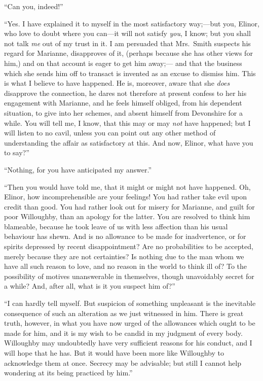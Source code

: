 ``Can you, indeed!''

``Yes. I have explained it to myself in the most
satisfactory way;---but you, Elinor, who love to doubt
where you can---it will not satisfy \emph{you}, I know; but you
shall not talk \emph{me} out of my trust in it.  I am persuaded
that Mrs.\ Smith suspects his regard for Marianne,
disapproves of it, (perhaps because she has other views
for him,) and on that account is eager to get him away;---%
and that the business which she sends him off to transact
is invented as an excuse to dismiss him.  This is what I
believe to have happened.  He is, moreover, aware that she
\emph{does} disapprove the connection, he dares not therefore
at present confess to her his engagement with Marianne,
and he feels himself obliged, from his dependent situation,
to give into her schemes, and absent himself from
Devonshire for a while.  You will tell me, I know,
that this may or may \emph{not} have happened; but I will listen
to no cavil, unless you can point out any other method
of understanding the affair as satisfactory at this.
And now, Elinor, what have you to say?''

``Nothing, for you have anticipated my answer.''

``Then you would have told me, that it might or might not
have happened.  Oh, Elinor, how incomprehensible are your
feelings!  You had rather take evil upon credit than good.
You had rather look out for misery for Marianne, and guilt
for poor Willoughby, than an apology for the latter.
You are resolved to think him blameable, because he took
leave of us with less affection than his usual behaviour
has shewn.  And is no allowance to be made for inadvertence,
or for spirits depressed by recent disappointment?  Are
no probabilities to be accepted, merely because they
are not certainties?  Is nothing due to the man whom we
have all such reason to love, and no reason in the world
to think ill of?  To the possibility of motives unanswerable
in themselves, though unavoidably secret for a while?  And,
after all, what is it you suspect him of?''

``I can hardly tell myself.  But suspicion of
something unpleasant is the inevitable consequence
of such an alteration as we just witnessed in him.
There is great truth, however, in what you have now urged
of the allowances which ought to be made for him, and it
is my wish to be candid in my judgment of every body.
Willoughby may undoubtedly have very sufficient
reasons for his conduct, and I will hope that he has.
But it would have been more like Willoughby to acknowledge
them at once.  Secrecy may be advisable; but still I
cannot help wondering at its being practiced by him.''

